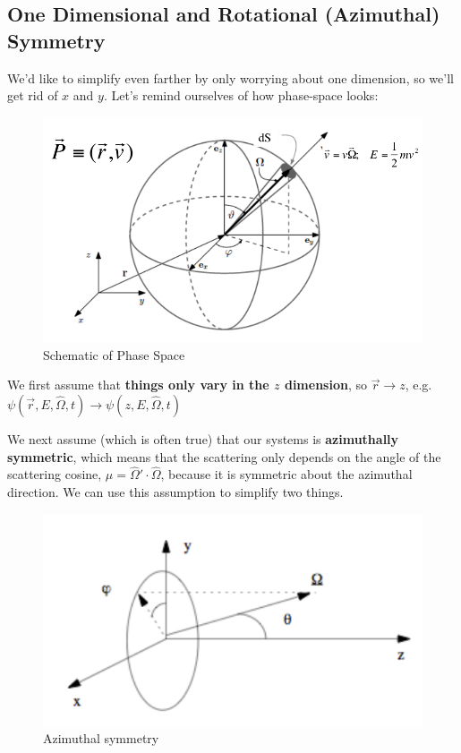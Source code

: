 \documentclass[12pt]{article}
\newcommand{\vOmega}{\ensuremath{\hat{\Omega}}}
\begin{document}
\subsection*{One Dimensional and Rotational (Azimuthal) Symmetry}
We'd like to simplify even farther by only worrying about one dimension, so we'll get rid of $x$ and $y$. Let's remind ourselves of how phase-space looks:
\begin{figure}[h!]
    \begin{center}
    \includegraphics[keepaspectratio, width = 4 in]{phase-space}
    \end{center}
    \caption{Schematic of Phase Space}
    \label{fig:phase_space}
\end{figure}

We first assume that \textbf{things only vary in the $z$ dimension}, so $\vec{r} \rightarrow z$, e.g.\\ $\psi(\vec{r}, E, \vOmega, t) \rightarrow \psi(z, E, \vOmega, t)$

We next assume (which is often true) that our systems is \textbf{azimuthally symmetric}, which means that the scattering only depends on the angle of the scattering cosine, $\mu =\vOmega' \cdot \vOmega$, because it is symmetric about the azimuthal direction. We can use this assumption to simplify two things. 
\begin{figure}[h!]
    \begin{center}
    \includegraphics[keepaspectratio, width = 3 in]{azimuthal}
    \end{center}
    \caption{Azimuthal symmetry}
    \label{fig:phase_space}
\end{figure}
\end{document}
